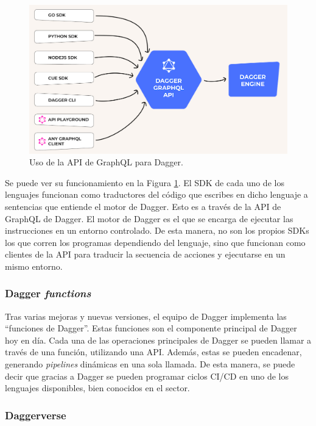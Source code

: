 \begin{figure}
  \centerline{\includegraphics[width=14cm]{figuras/graphql}}
  \caption{Uso de la API de GraphQL para Dagger\cite{img:graphql}.}
  \label{fig:graphql}
\end{figure}

Se puede ver su funcionamiento en la Figura \ref{fig:graphql}. El SDK de cada uno de los lenguajes funcionan como traductores del código que escribes en dicho lenguaje a sentencias que entiende el motor de Dagger. Esto es a través de la API de GraphQL de Dagger. El motor de Dagger es el que se encarga de ejecutar las instrucciones en un entorno controlado. De esta manera, no son los propios SDKs los que corren los programas dependiendo del lenguaje, sino que funcionan como clientes de la API para traducir la secuencia de acciones y ejecutarse en un mismo entorno.

\subsubsection*{Dagger \textit{functions}}

Tras varias mejoras y nuevas versiones, el equipo de Dagger implementa las ``funciones de Dagger''. Estas funciones son el componente principal de Dagger hoy en día. Cada una de las operaciones principales de Dagger se pueden llamar a través de una función, utilizando una API. Además, estas se pueden encadenar, generando \textit{pipelines} dinámicas en una sola llamada. De esta manera, se puede decir  que gracias a Dagger se pueden programar ciclos CI/CD en uno de los lenguajes disponibles, bien conocidos en el sector.

\subsubsection*{Daggerverse}

